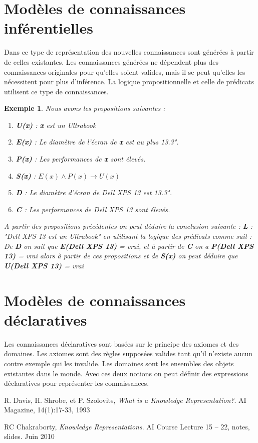 \documentclass[12pt,a4paper]{report}
\newtheorem{example}{Exemple}
\begin{document}
\section{Modèles de connaissances inférentielles}
Dans ce type de représentation des nouvelles connaissances sont générées à partir de celles existantes.
Les connaissances générées ne dépendent plus des connaissances originales pour qu'elles soient valides, mais
il se peut qu'elles les nécessitent pour plus d'inférence.\cite{KRC} La logique propositionnelle et celle de
prédicats utilisent ce type de connaissances.

\begin{example}
Nous avons les propositions suivantes :
\begin{enumerate}
\item \textbf{U(x)} : \textbf{x} est un Ultrabook
\item \textbf{E(x)} : Le diamètre de l'écran de \textbf{x} est au plus 13.3".
\item \textbf{P(x)} : Les performances de \textbf{x} sont élevés.
\item \textbf{S(x)} : $ E(x) \wedge P(x) \rightarrow U(x) $
\item \textbf{D} : Le diamètre d'écran de Dell XPS 13 est 13.3".
\item \textbf{C} : Les performances de Dell XPS 13 sont élevés.
\end{enumerate}
A partir des propositions précédentes on peut déduire la conclusion suivante :
\textbf{L} : "Dell XPS 13 est un Ultrabook"  en utilisant la logique des prédicats comme suit :
De \textbf{D} on sait que \textbf{E(Dell XPS 13)} = vrai, et à partir de \textbf{C} on a \textbf{P(Dell XPS 13)} = vrai
alors à partir de ces propositions et de \textbf{S(x)} on peut déduire que \textbf{U(Dell XPS 13)} = vrai
\end{example}

\section{Modèles de connaissances déclaratives}
Les connaissances déclaratives sont basées sur le principe des axiomes et des domaines. Les axiomes sont des règles
supposées valides tant qu'il n'existe aucun contre exemple qui les invalide. Les domaines sont les ensembles des objets
existantes dans le monde. Avec ces deux notions on peut définir des expressions déclaratives pour représenter les
connaissances.\cite{KRC}

\begin{thebibliography}{9}
R. Davis, H. Shrobe, et P. Szolovits,
\emph{What is a Knowledge Representation?}.
AI Magazine, 14(1):17-33, 1993

RC Chakraborty,
\emph{Knowledge Representations}.
AI Course Lecture 15 – 22, notes, slides. Juin 2010 
\end{thebibliography}
\end{document}
